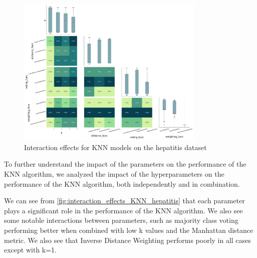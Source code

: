 \begin{figure}[!ht]
    \centering
    \includegraphics[width=0.8\textwidth]{figures/interaction_effects_KNN_hepatitis.png}
    \caption{Interaction effects for KNN models on the hepatitis dataset}
    \label{fig:interaction_effects_KNN_hepatitis}
\end{figure}

To further understand the impact of the parameters on the performance of the KNN algorithm,
we analyzed the impact of the hyperparameters on the performance of the KNN algorithm, both independently and in combination.

We can see from \autoref{fig:interaction_effects_KNN_hepatitis} that each parameter plays a significant role in the performance of the KNN algorithm.
We also see some notable interactions between parameters, such as majority class voting performing better when combined with low k values and the Manhattan distance metric.
We also see that Inverse Distance Weighting performs poorly in all cases except with k=1.

